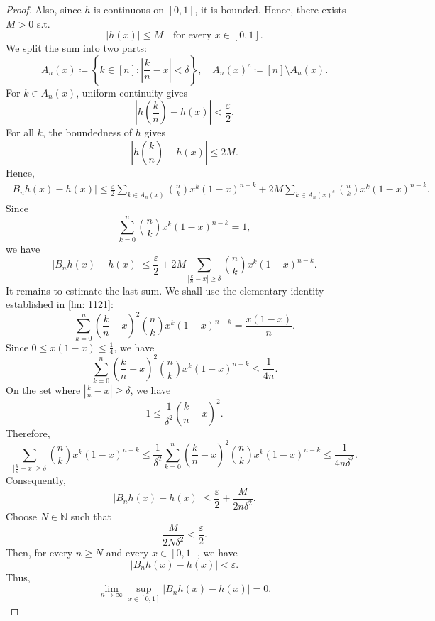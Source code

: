 \begin{proof}
    Also, since \(h\) is continuous on \([0, 1]\), it is bounded. Hence, there exists \(M > 0\) s.t. 
    \[
        \vert h(x) \vert \le M \quad \text{for every } x \in [0, 1]. 
    \]    
    We split the sum into two parts:
    \[
        A_n(x) \coloneqq \left\{ k \in [n]: \left\vert \frac{k}{n} - x \right\vert < \delta  \right\}, \quad A_n(x)^c \coloneqq [n] \setminus A_n(x). 
    \]
    For \(k \in A_n(x)\), uniform continuity gives 
    \[
        \left\vert h \left( \frac{k}{n} \right) - h(x)  \right\vert < \frac{\varepsilon}{2}. 
    \] 
    For all \(k\), the boundedness of \(h\) gives 
    \[
        \left\vert h \left( \frac{k}{n} \right) - h(x)  \right\vert \le 2M. 
    \]  
    Hence,
    \begin{align*}
        \left\vert B_n h(x) - h(x) \right\vert \le \frac{\varepsilon}{2} \sum_{k \in A_n(x)} \binom{n}{k} x^k (1 - x)^{n - k} + 2M \sum_{k \in A_n(x)^c} \binom{n}{k} x^k (1 - x)^{n - k}.   
    \end{align*}
    Since
    \[
        \sum_{k=0}^n \binom{n}{k} x^k (1 - x)^{n - k} = 1, 
    \] 
    we have
    \[
        \vert B_n h(x) - h(x) \vert \le \frac{\varepsilon}{2} + 2M \sum_{\left\vert \frac{k}{n} - x \right\vert \ge \delta} \binom{n}{k} x^k (1 - x)^{n - k}.  
    \]
    It remains to estimate the last sum. We shall use the elementary identity established in \autoref{lm: 1121}:
    \[
        \sum_{k=0}^n \left( \frac{k}{n} - x \right)^2 \binom{n}{k} x^k (1 - x)^{n - k} = \frac{x(1 - x)}{n}.  
    \] 
    Since \(0 \le x(1 - x) \le \frac{1}{4}\), we have 
    \[
        \sum_{k=0}^n \left( \frac{k}{n} - x \right)^2 \binom{n}{k} x^k (1 - x)^{n - k} \le \frac{1}{4n}.  
    \] 
    On the set where \(\left\vert \frac{k}{n} - x \right\vert \ge \delta \), we have 
    \[
        1 \le \frac{1}{\delta ^2} \left( \frac{k}{n} - x \right)^2. 
    \] 
    Therefore, 
    \[
        \sum_{\left\vert \frac{k}{n} - x \right\vert \ge \delta } \binom{n}{k} x^k (1 - x)^{n - k} \le \frac{1}{\delta ^2} \sum_{k=0}^n \left( \frac{k}{n} - x \right)^2 \binom{n}{k} x^k (1 - x)^{n - k} \le \frac{1}{4n \delta ^2}.   
    \]
    Consequently, 
    \[
        \vert B_n h(x) - h(x) \vert \le \frac{\varepsilon}{2} + \frac{M}{2n \delta ^2}. 
    \]
    Choose \(N \in \mathbb{N}\) such that 
    \[
        \frac{M}{2N \delta ^2} < \frac{\varepsilon}{2}.
    \] 
    Then, for every \(n \ge N\) and every \(x \in [0, 1]\), we have 
    \[
        \vert B_n h(x) - h(x) \vert < \varepsilon. 
    \]  
    Thus, 
    \[
        \lim_{n \to \infty} \sup _{x \in [0, 1]} \vert B_n h(x) - h(x) \vert = 0.  
    \]


\end{proof}
